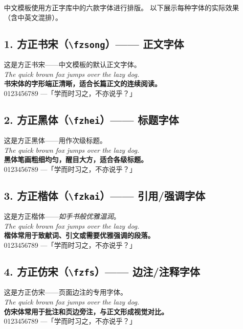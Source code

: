 
{%

 中文模板使用方正字库中的六款字体进行排版。
以下展示每种字体的实际效果（含中英文混排）。

\medskip

\subsection*{1. 方正书宋（\texttt{\textbackslash fzsong}）—— 正文字体}
\fzsong
这是方正书宋——中文模板的默认正文字体。\\
\textit{The quick brown fox jumps over the lazy dog.}\\
\textbf{书宋体的字形端正清晰，适合长篇正文的连续阅读。}\\
0123456789 —「学而时习之，不亦说乎？」

\medskip

\subsection*{2. 方正黑体（\texttt{\textbackslash fzhei}）—— 标题字体}
\fzhei
这是方正黑体——{\large 用作次级标题}。\\
\textit{The quick brown fox jumps over the lazy dog.}\\
\textbf{黑体笔画粗细均匀，醒目大方，适合各级标题。}\\
0123456789 —「学而时习之，不亦说乎？」

\medskip

\subsection*{3. 方正楷体（\texttt{\textbackslash fzkai}）—— 引用/强调字体}
\fzkai
这是方正楷体——\textit{如手书般优雅温润}。\\
\textit{The quick brown fox jumps over the lazy dog.}\\
\textbf{楷体常用于致献词、引文或需要优雅强调的段落。}\\
0123456789 —「学而时习之，不亦说乎？」

\medskip

\subsection*{4. 方正仿宋（\texttt{\textbackslash fzfs}）—— 边注/注释字体}
\fzfs
这是方正仿宋——\footnotesize 页面边注的专用字体。\\
\textit{The quick brown fox jumps over the lazy dog.}\\
\textbf{仿宋体常用于批注和页边旁注，与正文形成视觉对比。}\\
0123456789 —「学而时习之，不亦说乎？」

}

